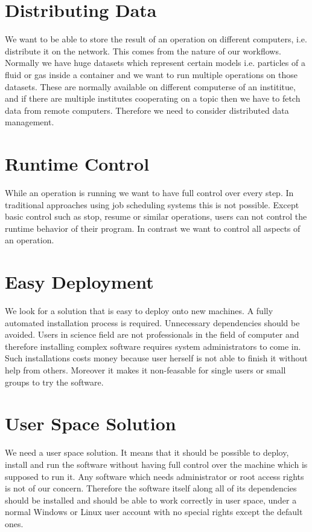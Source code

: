 \section{Distributing Data}
We want to be able to store the result of an operation on different computers, i.e. distribute it on the network.
This comes from the nature of our workflows. Normally we have huge datasets which represent certain models i.e.
particles of a fluid or gas inside a container and we want to run multiple operations on those datasets. These
are normally available on different computerse of an instititue, and if there are multiple institutes cooperating
on a topic then we have to fetch data from remote computers. Therefore we need to consider distributed data management.

\section{Runtime Control}
While an operation is running we want to have full control over every step. In traditional approaches using job
scheduling systems this is not possible. Except basic control such as stop, resume or similar operations, users
can not control the runtime behavior of their program. In contrast we want to control all aspects of an operation.

\section{Easy Deployment}
We look for a solution that is easy to deploy onto new machines. A fully automated installation process
is required. Unnecessary dependencies should be avoided. Users in science field are not professionals in the field
of computer and therefore installing complex software requires system administrators to come in. Such installations
costs money because user herself is not able to finish it without help from others. Moreover it makes it non-feasable
for single users or small groups to try the software.

\section{User Space Solution}
We need a user space solution. It means that it should be possible to deploy, install and run the software without
having full control over the machine which is supposed to run it. Any software which needs administrator or root access
rights is not of our concern. Therefore the software itself along all of its dependencies should be installed and should
be able to work correctly in user space, under a normal Windows or Linux user account with no special rights except the
default ones.

